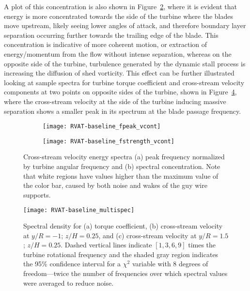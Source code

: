 A plot of this concentration is also shown in
Figure~\ref{fig:RVAT-baseline-fstrength}, where it is evident that energy is
more concentrated towards the side of the turbine where the blades move
upstream, likely seeing lower angles of attack, and therefore boundary layer
separation occurring further towards the trailing edge of the blade. This
concentration is indicative of more coherent motion, or extraction of
energy/momentum from the flow without intense separation, whereas on the
opposite side of the turbine, turbulence generated by the dynamic stall process
is increasing the diffusion of shed vorticity. This effect can be further
illustrated looking at sample spectra for turbine torque coefficient and
cross-stream velocity components at two points on opposite sides of the turbine,
shown in Figure~\ref{fig:RVAT-baseline-multispec}, where the cross-stream
velocity at the side of the turbine inducing massive separation shows a smaller
peak in its spectrum at the blade passage frequency.

\begin{figure}
    \centering

    \begin{subfigure}{\textwidth}
        \centering
        \texttt{[image: RVAT-baseline\_fpeak\_vcont]}
        \caption{}
        \label{fig:RVAT-baseline-fpeak}
    \end{subfigure}

    \begin{subfigure}{\textwidth}
        \centering
        \texttt{[image: RVAT-baseline\_fstrength\_vcont]}
        \caption{}
        \label{fig:RVAT-baseline-fstrength}
    \end{subfigure}

    \caption{Cross-stream velocity energy spectra (a) peak frequency normalized by
        turbine angular frequency and (b) spectral concentration. Note
        that white regions have values higher than the maximum value of the color
        bar, caused by both noise and wakes of the guy wire supports.}

    \label{fig:RVAT-baseline-fcont}
\end{figure}

\begin{figure}
    \centering

    \texttt{[image: RVAT-baseline\_multispec]}

    \caption{Spectral density for (a) torque coefficient, (b) cross-stream
        velocity at $y/R = -1$; $z/H = 0.25$, and (c) cross-stream velocity at $y/R
        = 1.5$; $z/H = 0.25$. Dashed vertical lines indicate $[1, 3, 6, 9]$ times
        the turbine rotational frequency and the shaded gray region indicates the
        95\% confidence interval for a $\chi^2$ variable with 8 degrees of
        freedom---twice the number of frequencies over which spectral values were
        averaged to reduce noise.}

    \label{fig:RVAT-baseline-multispec}
\end{figure}


